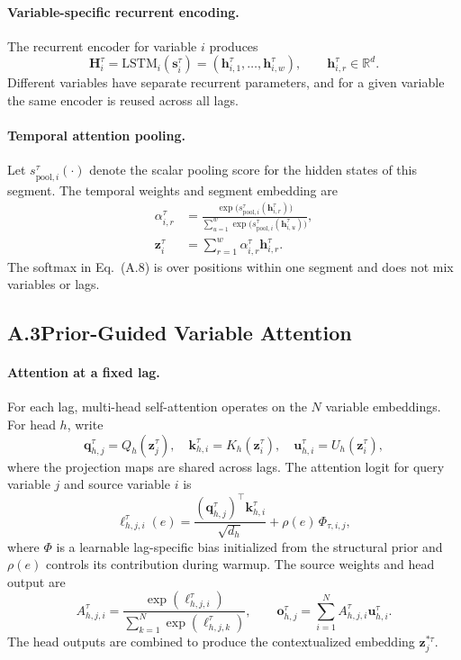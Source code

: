 \documentclass[letterpaper]{article}
\begin{document}
\paragraph{Variable-specific recurrent encoding.}
The recurrent encoder for variable $i$ produces
\begin{equation}
\mathbf{H}^\tau_i=\mathrm{LSTM}_i(\mathbf{s}^\tau_i)=(\mathbf{h}^\tau_{i,1},\ldots,\mathbf{h}^\tau_{i,w}),\qquad \mathbf{h}^\tau_{i,r}\in\mathbb{R}^d.
\tag{A.7}
\end{equation}
Different variables have separate recurrent parameters, and for a given variable the same encoder is reused across all lags.

\paragraph{Temporal attention pooling.}
Let $s^\tau_{\mathrm{pool},i}(\cdot)$ denote the scalar pooling score for the hidden states of this segment. The temporal weights and segment embedding are
\begin{align}
\alpha^\tau_{i,r}&=\frac{\exp\bigl(s^\tau_{\mathrm{pool},i}(\mathbf{h}^\tau_{i,r})\bigr)}{\sum_{u=1}^{w}\exp\bigl(s^\tau_{\mathrm{pool},i}(\mathbf{h}^\tau_{i,u})\bigr)}, \tag{A.8}\\
\mathbf{z}^\tau_i&=\sum_{r=1}^{w}\alpha^\tau_{i,r}\mathbf{h}^\tau_{i,r}. \tag{A.9}
\end{align}
The softmax in Eq.~(A.8) is over positions within one segment and does not mix variables or lags.

\subsection{A.3\quad Prior-Guided Variable Attention}

\paragraph{Attention at a fixed lag.}
For each lag, multi-head self-attention operates on the $N$ variable embeddings. For head $h$, write
\begin{equation}
\mathbf{q}^\tau_{h,j}=Q_h(\mathbf{z}^\tau_j),\quad \mathbf{k}^\tau_{h,i}=K_h(\mathbf{z}^\tau_i),\quad \mathbf{u}^\tau_{h,i}=U_h(\mathbf{z}^\tau_i),
\tag{A.10}
\end{equation}
where the projection maps are shared across lags. The attention logit for query variable $j$ and source variable $i$ is
\begin{equation}
\ell^\tau_{h,j,i}(e)=\frac{(\mathbf{q}^\tau_{h,j})^\top\mathbf{k}^\tau_{h,i}}{\sqrt{d_h}}+\rho(e)\,\Phi_{\tau,i,j},
\tag{A.11}
\end{equation}
where $\Phi$ is a learnable lag-specific bias initialized from the structural prior and $\rho(e)$ controls its contribution during warmup. The source weights and head output are
\begin{equation}
A^\tau_{h,j,i}=\frac{\exp(\ell^\tau_{h,j,i})}{\sum_{k=1}^{N}\exp(\ell^\tau_{h,j,k})},\qquad \mathbf{o}^\tau_{h,j}=\sum_{i=1}^{N}A^\tau_{h,j,i}\mathbf{u}^\tau_{h,i}.
\tag{A.12}
\end{equation}
The head outputs are combined to produce the contextualized embedding $\mathbf{z}^{*\tau}_j$.
\end{document}

